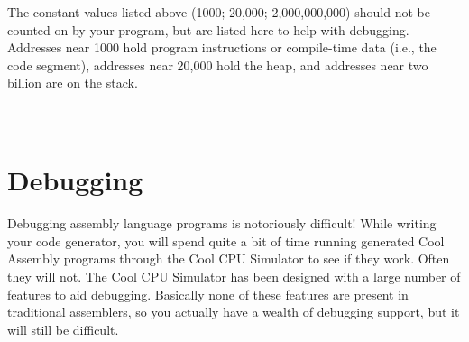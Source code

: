 \documentclass[]{article}
\begin{document}
The constant values listed above (1000; 20,000; 2,000,000,000) should
not be counted on by your program, but are listed here to help with
debugging. Addresses near 1000 hold program instructions or compile-time
data (i.e., the code segment), addresses near 20,000 hold the heap, and
addresses near two billion are on the stack.

\section{\\ Debugging}

Debugging assembly language programs is notoriously difficult! While
writing your code generator, you will spend quite a bit of time running
generated Cool Assembly programs through the Cool CPU Simulator to see
if they work. Often they will not. The Cool CPU Simulator has been
designed with a large number of features to aid debugging. Basically
none of these features are present in traditional assemblers, so you
actually have a wealth of debugging support, but it will still be
difficult.
\end{document}

